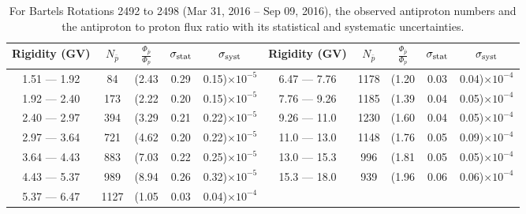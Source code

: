 \begin{table}[p] 
\renewcommand\baselinestretch{1.3}\selectfont
\setlength\tabcolsep{3pt}
\centering
\begin{tabular}{ccccc | ccccc}
\hline
\textbf{Rigidity}  (GV)  & $N_{\bar{p}}$ & $\frac{\Phi_{\bar{p}}}{\Phi_{p}}$ & $\sigma_{\rm{stat}}$ & $\sigma_{\rm{syst}}$ \hspace{1cm}   & \textbf{Rigidity}  (GV)  & $N_{\bar{p}}$ & $\frac{\Phi_{\bar{p}}}{\Phi_{p}}$ & $\sigma_{\rm{stat}}$ & $\sigma_{\rm{syst}}$ \hspace{1cm} \\ 
\hline
1.51 — 1.92   &  84                  &(2.43                          &  0.29              &      0.15)$\times 10^{-5}$  & 6.47 — 7.76                &  1178                    &(1.20                                &  0.03                   &      0.04)$\times 10^{-4}$\\
1.92 — 2.40   &  173                &(2.22                          &  0.20              &      0.15)$\times 10^{-5}$  & 7.76 — 9.26                &  1185                    &(1.39                                &  0.04                   &      0.05)$\times 10^{-4}$\\
2.40 — 2.97   &  394                &(3.29                          &  0.21              &      0.22)$\times 10^{-5}$  & 9.26 — 11.0                &  1230                    &(1.60                                &  0.04                   &      0.05)$\times 10^{-4}$\\    
2.97 — 3.64   &  721                &(4.62                          &  0.20              &      0.22)$\times 10^{-5}$  & 11.0 — 13.0                 &  1148                    &(1.76                                &  0.05                   &      0.09)$\times 10^{-4}$\\    
3.64 — 4.43   &  883                &(7.03                          &  0.22              &      0.25)$\times 10^{-5}$  & 13.0 — 15.3               &  996                    &(1.81                                &  0.05                   &      0.05)$\times 10^{-4}$\\
4.43 — 5.37   &  989                &(8.94                          &  0.26              &      0.32)$\times 10^{-5}$  & 15.3 — 18.0               &  939                    &(1.96                                &  0.06                   &      0.06)$\times 10^{-4}$\\
5.37 — 6.47   &  1127               &(1.05                         &  0.03              &      0.04)$\times 10^{-4}$  & \\
\hline
\end{tabular}
\caption[Antiproton to proton flux ratio for Bartels Rotations 2492 to 2498]{For Bartels Rotations 2492 to 2498 (Mar 31, 2016 – Sep 09, 2016), the observed antiproton numbers and the antiproton to proton flux ratio with its statistical and systematic uncertainties.}
\label{TableOfDependent12}
\end{table}

